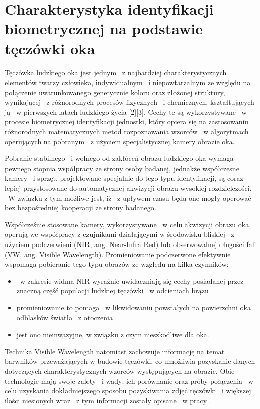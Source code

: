 
\section{Charakterystyka identyfikacji biometrycznej na podstawie tęczówki oka}
\label{sec:zawartoscPracy}


Tęczówka ludzkiego oka jest jednym ~z najbardziej charakterystycznych elementów twarzy człowieka, indywidualnym ~i niepowtarzalnym ze względu na połączenie uwarunkowanego genetycznie koloru oraz złożonej struktury, wynikającej ~z różnorodnych procesów fizycznych ~i chemicznych, kształtujących ją ~w pierwszych latach ludzkiego życia [2][3]. Cechy te są wykorzystywane ~w procesie biometrycznej identyfikacji jednostki, który opiera się na zastosowaniu różnorodnych matematycznych metod rozpoznawania wzorców ~w algorytmach operujących na pobranym ~z użyciem specjalistycznej kamery obrazie oka.

Pobranie stabilnego ~i wolnego od zakłóceń obrazu ludzkiego oka wymaga pewnego stopnia współpracy ze strony osoby badanej, jednakże współczesne kamery ~i sprzęt, projektowane specjalnie do tego typu identyfikacji, są  coraz lepiej przystosowane do automatycznej akwizycji obrazu wysokiej rozdzielczości. ~W związku z tym możliwe jest, iż ~z upływem czasu będą one mogły operować bez bezpośredniej kooperacji ze strony badanego.

Współcześnie stosowane kamery, wykorzystywane ~w celu akwizycji obrazu oka, operują we współpracy z czujnikami działającymi w środowisku bliskiej ~z użyciem podczerwieni (NIR, ang. Near-Infra Red) lub obserwowalnej długości fali (VW, ang. Visible Wavelength). Promieniowanie podczerwone efektywnie wspomaga pobieranie tego typu obrazów ze względu na kilka czynników:
\begin{itemize} 
\item ~w zakresie widma NIR wyraźnie uwidaczniają się cechy posiadanej przez znaczną część populacji ludzkiej tęczówki ~w  odcieniach brązu
\item promieniowanie to pomaga ~w likwidowaniu powstałych na powierzchni oka odblasków światła ~z otoczenia 
\item jest ono nieinwazyjne, w związku z czym nieszkodliwe dla oka.
\end{itemize}
 Technika Visible Wavelength natomiast zachowuje informację na temat barwników przeważających w budowie tęczówki, co umożliwia pozyskanie danych dotyczących charakterystycznych wzorców występujących na obrazie. Obie technologie mają swoje zalety ~i wady; ich porównanie oraz próby połączenia ~w celu uzyskania dokładniejszego sposobu pozyskiwania zdjęć tęczówki ~i większej ilości niesionych wraz ~z tym informacji zostały opisane ~w pracy \cite{Hos10}. 

